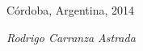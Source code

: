 \newpage
Córdoba, Argentina, 2014\\[9.5cm]
\begin{flushright}
    \textit{Rodrigo Carranza Astrada}
\end{flushright}
